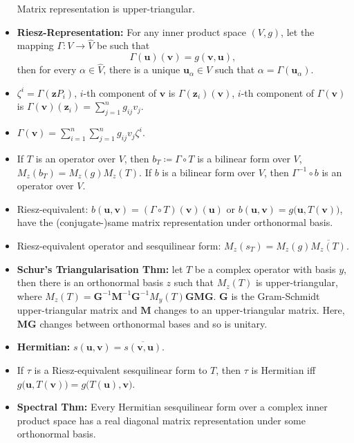 \documentclass[10pt]{article}
\begin{document}
\begin{multicols*}{3}
\begin{itemize}
\begin{equation*}
            \end{equation*}
            Matrix representation is upper-triangular.
            \item \textbf{Riesz-Representation:} For any inner product space $(V, g)$, let the mapping $\Gamma \colon V \to \widehat{V}$ be such that
            \begin{equation*}
                \Gamma(\bm{u})(\bm{v}) = g(\bm{v}, \bm{u}),
            \end{equation*}
            then for every $\alpha \in \widehat{V}$, there is a unique $\bm{u}_{\alpha} \in V$ such that $\alpha = \Gamma\left(\bm{u}_{\alpha}\right)$.
            \item $\zeta^i = \Gamma(\bm{z}P_i)$, $i$-th component of $\bm{v}$ is $\Gamma(\bm{z}_i)(\bm{v})$, $i$-th component of $\Gamma(\bm{v})$ is $\Gamma(\bm{v})(\bm{z}_i) = \sum_{j = 1}^{n}g_{ij}v_j$.
            \item $\Gamma(\bm{v}) = \sum_{i = 1}^{n}\sum_{j = 1}^{n}g_{ij}v_j\zeta^i$.
            \item If $T$ is an operator over $V$, then $b_T \coloneqq \Gamma \circ T$ is a bilinear form over $V$, $M_z(b_T) = M_z(g)M_z(T)$. If $b$ is a bilinear form over $V$, then $\Gamma^{-1} \circ b$ is an operator over $V$.
            \item Riesz-equivalent: $b(\bm{u}, \bm{v}) = (\Gamma \circ T)(\bm{v})(\bm{u})$ or $b(\bm{u}, \bm{v}) = g\bigl(\bm{u}, T(\bm{v})\bigr)$, have the (conjugate-)same matrix representation under orthonormal basis.
            \item Riesz-equivalent operator and sesquilinear form: $M_z(s_T) = M_z(g)\overline{M_z(T)}$.
            \item \textbf{Schur's Triangularisation Thm:} let $T$ be a complex operator with basis $y$, then there is an orthonormal basis $z$ such that $M_z(T)$ is upper-triangular, where $M_z(T) = \bm{G}^{-1}\bm{M}^{-1}\bm{G}^{-1}M_y(T)\bm{G}\bm{M}\bm{G}$. $\bm{G}$ is the Gram-Schmidt upper-triangular matrix and $\bm{M}$ changes to an upper-triangular matrix. Here, $\bm{M}\bm{G}$ changes between orthonormal bases and so is unitary.
            \item \textbf{Hermitian:} $s(\bm{u}, \bm{v}) = \overline{s(\bm{v}, \bm{u})}$.
            \item If $\tau$ is a Riesz-equivalent sesquilinear form to $T$, then $\tau$ is Hermitian iff $g\bigl(\bm{u}, T(\bm{v})\bigr) = g\bigl(T(\bm{u}), \bm{v}\bigr)$.
            \item \textbf{Spectral Thm:} Every Hermitian sesquilinear form over a complex inner product space has a real diagonal matrix representation under some orthonormal basis.

\end{itemize}
\end{multicols*}
\end{document}
